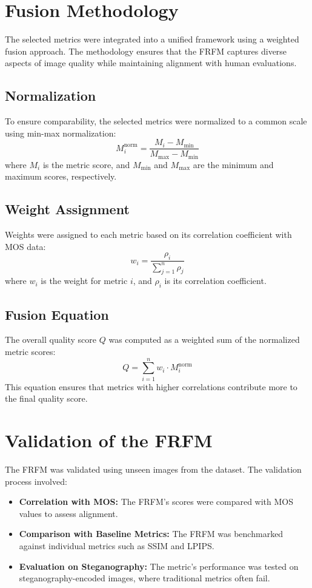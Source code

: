 \section{Fusion Methodology}

The selected metrics were integrated into a unified framework using a weighted fusion approach. The methodology ensures that the FRFM captures diverse aspects of image quality while maintaining alignment with human evaluations.

\subsection{Normalization}

To ensure comparability, the selected metrics were normalized to a common scale using min-max normalization:
\[
M_i^{\text{norm}} = \frac{M_i - M_{\text{min}}}{M_{\text{max}} - M_{\text{min}}}
\]
where \(M_i\) is the metric score, and \(M_{\text{min}}\) and \(M_{\text{max}}\) are the minimum and maximum scores, respectively.

\subsection{Weight Assignment}

Weights were assigned to each metric based on its correlation coefficient with MOS data:
\[
w_i = \frac{\rho_i}{\sum_{j=1}^{n} \rho_j}
\]
where \(w_i\) is the weight for metric \(i\), and \(\rho_i\) is its correlation coefficient.

\subsection{Fusion Equation}

The overall quality score \(Q\) was computed as a weighted sum of the normalized metric scores:
\[
Q = \sum_{i=1}^{n} w_i \cdot M_i^{\text{norm}}
\]
This equation ensures that metrics with higher correlations contribute more to the final quality score.

\section{Validation of the FRFM}

The FRFM was validated using unseen images from the dataset. The validation process involved:
\begin{itemize}
    \item \textbf{Correlation with MOS:} The FRFM’s scores were compared with MOS values to assess alignment.
    \item \textbf{Comparison with Baseline Metrics:} The FRFM was benchmarked against individual metrics such as SSIM and LPIPS.
    \item \textbf{Evaluation on Steganography:} The metric's performance was tested on steganography-encoded images, where traditional metrics often fail.
\end{itemize}

